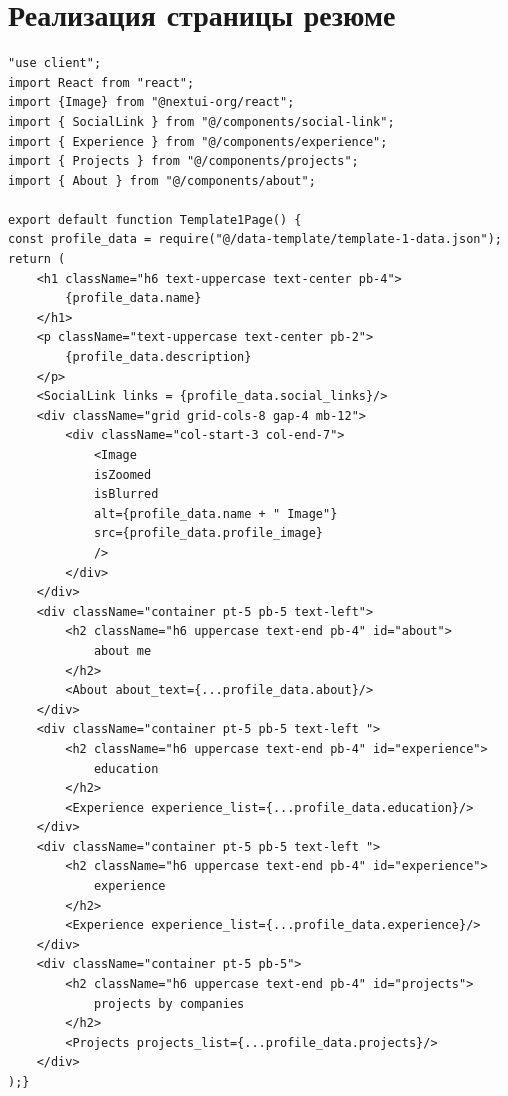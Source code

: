 \documentclass[master, och, diploma]{SCWorks}
\begin{document}
\section{Реализация страницы резюме}
\begin{verbatim}
"use client";
import React from "react";
import {Image} from "@nextui-org/react";
import { SocialLink } from "@/components/social-link";
import { Experience } from "@/components/experience";
import { Projects } from "@/components/projects";
import { About } from "@/components/about";

export default function Template1Page() {
const profile_data = require("@/data-template/template-1-data.json");
return (
    <h1 className="h6 text-uppercase text-center pb-4">
        {profile_data.name}
    </h1>
    <p className="text-uppercase text-center pb-2">
        {profile_data.description}
    </p>
    <SocialLink links = {profile_data.social_links}/>
    <div className="grid grid-cols-8 gap-4 mb-12">
        <div className="col-start-3 col-end-7">
            <Image
            isZoomed
            isBlurred
            alt={profile_data.name + " Image"}
            src={profile_data.profile_image}
            />
        </div>
    </div>
    <div className="container pt-5 pb-5 text-left">
        <h2 className="h6 uppercase text-end pb-4" id="about">
            about me
        </h2>
        <About about_text={...profile_data.about}/>
    </div>
    <div className="container pt-5 pb-5 text-left ">
        <h2 className="h6 uppercase text-end pb-4" id="experience">
            education
        </h2>
        <Experience experience_list={...profile_data.education}/>
    </div>
    <div className="container pt-5 pb-5 text-left ">
        <h2 className="h6 uppercase text-end pb-4" id="experience">
            experience
        </h2>
        <Experience experience_list={...profile_data.experience}/>
    </div>
    <div className="container pt-5 pb-5">
        <h2 className="h6 uppercase text-end pb-4" id="projects">
            projects by companies
        </h2>
        <Projects projects_list={...profile_data.projects}/>
    </div>
);}    
\end{verbatim}
\end{document}
